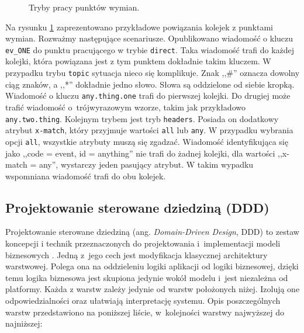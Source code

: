 \documentclass[a4paper]{book}
\newcommand{\obcy}[2]{{\selectlanguage{#1}#2}}
\newcommand{\ang}[1]{\emph{\obcy{british}{#1}}}
\begin{document}
{\begin{figure}
	\caption{Tryby pracy punktów wymian.}
	\label{id:fig:5}
\end{figure}
Na rysunku \ref{id:fig:5} zaprezentowano przykładowe powiązania kolejek z punktami wymian. Rozważmy następujące scenariusze. Opublikowano wiadomość o kluczu \lstinline|ev_ONE| do punktu pracującego w trybie \lstinline|direct|. Taka wiadomość trafi do każdej kolejki, która powiązana jest z tym punktem dokładnie takim kluczem. W przypadku trybu \lstinline|topic| sytuacja nieco się komplikuje. Znak ,,\#'' oznacza dowolny ciąg znaków, a ,,*'' dokładnie jedno słowo. Słowa są oddzielone od siebie kropką. Wiadomość o kluczu \lstinline|any.thing.one| trafi do pierwszej kolejki. Do drugiej może trafić wiadomość o~trójwyrazowym wzorze, takim jak przykładowo \lstinline|any.two.thing|. Kolejnym trybem jest tryb \lstinline|headers|. Posiada on dodatkowy atrybut \lstinline|x-match|, który przyjmuje wartości \lstinline|all| lub \lstinline|any|. W przypadku wybrania opcji \lstinline|all|, wszystkie atrybuty muszą się zgadzać. Wiadomość identyfikująca się jako ,,code = event, id = anything'' nie trafi do żadnej kolejki, dla wartości ,,x-match = any'', wystarczy jeden pasujący atrybut. W takim wypadku wspomniana wiadomość trafi do obu kolejek.


\subsection{Projektowanie sterowane dziedziną (DDD)}
\label{architekturaDDD}

Projektowanie sterowane dziedziną (ang. \ang{Domain-Driven Design}, DDD) to zestaw koncepcji i technik przeznaczonych do projektowania i~implementacji modeli biznesowych \cite{id:sobotka_DDD1}. Jedną z~jego cech jest modyfikacja klasycznej architektury warstwowej. Polega ona na oddzieleniu logiki aplikacji od logiki biznesowej, dzięki temu logika biznesowa jest skupiona jedynie wokół modelu i~jest niezależna od platformy. Każda z warstw zależy jedynie od warstw położonych niżej. Izolują one odpowiedzialności oraz ułatwiają interpretację systemu. Opis poszczególnych warstw przedstawiono na poniższej liście, w~kolejności warstwy najwyższej do najniższej:

}
\end{document}
